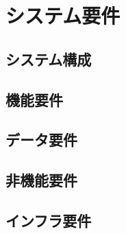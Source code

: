 \section{システム要件} \label{sec:system}

\subsection{システム構成}


\subsection{機能要件}


\subsection{データ要件}


\subsection{非機能要件}


\subsection{インフラ要件}

